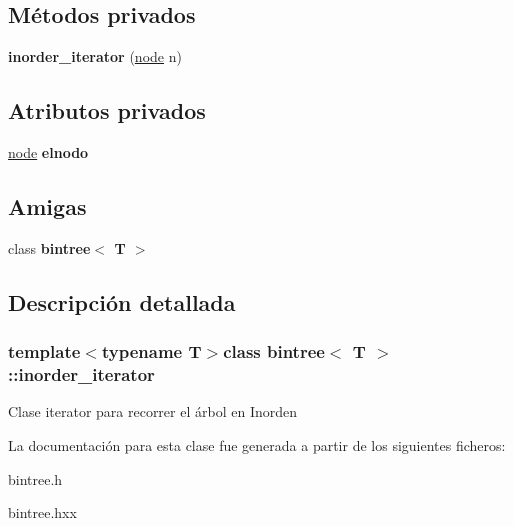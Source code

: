 \subsection*{Métodos privados}
\begin{DoxyCompactItemize}
\item 
\hypertarget{classbintree_1_1inorder__iterator_a277712df68d8f0e9414d439ceaa95eb2}{}{\bfseries inorder\+\_\+iterator} (\hyperlink{classbintree_1_1node}{node} n)\label{classbintree_1_1inorder__iterator_a277712df68d8f0e9414d439ceaa95eb2}

\end{DoxyCompactItemize}
\subsection*{Atributos privados}
\begin{DoxyCompactItemize}
\item 
\hypertarget{classbintree_1_1inorder__iterator_aaf773c5a5af6fe6aea5ea7b9b8592d10}{}\hyperlink{classbintree_1_1node}{node} {\bfseries elnodo}\label{classbintree_1_1inorder__iterator_aaf773c5a5af6fe6aea5ea7b9b8592d10}

\end{DoxyCompactItemize}
\subsection*{Amigas}
\begin{DoxyCompactItemize}
\item 
\hypertarget{classbintree_1_1inorder__iterator_a300e602ae13bd21fa092c5a5899e9eda}{}class {\bfseries bintree$<$ T $>$}\label{classbintree_1_1inorder__iterator_a300e602ae13bd21fa092c5a5899e9eda}

\end{DoxyCompactItemize}


\subsection{Descripción detallada}
\subsubsection*{template$<$typename T$>$class bintree$<$ T $>$\+::inorder\+\_\+iterator}

Clase iterator para recorrer el árbol en Inorden 

La documentación para esta clase fue generada a partir de los siguientes ficheros\+:\begin{DoxyCompactItemize}
\item 
bintree.\+h\item 
bintree.\+hxx\end{DoxyCompactItemize}
